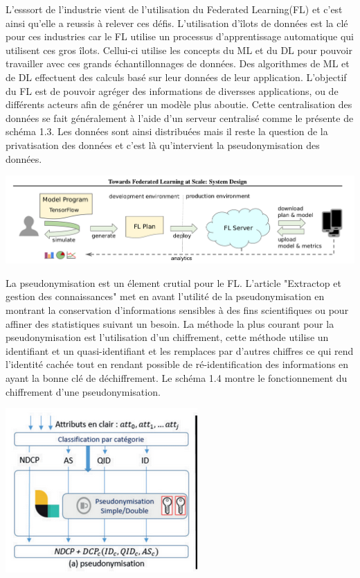 \documentclass[12pt,a4paper]{report}
\begin{document}
L'esssort de l'industrie vient de l'utilisation du Federated Learning(FL) et c'est ainsi qu'elle a reussis à relever ces défis. L'utilisation d'îlots de données est la clé pour ces industries car le FL utilise un processus d'apprentissage automatique qui utilisent ces gros îlots. Cellui-ci utilise les concepts du ML et du DL pour pouvoir travailler avec ces grands échantillonnages de données. Des algorithmes de ML et de DL effectuent des calculs basé sur leur données de leur application. L'objectif du FL est de pouvoir agréger des informations de diversses applications, ou de différents acteurs afin de générer un modèle plus aboutie. Cette centralisation des données se fait généralement à l'aide d'un serveur centralisé comme le présente de schéma 1.3. Les données sont ainsi distribuées mais il reste la question de la privatisation des données et c'est là qu'intervient la pseudonymisation des données.
 

\begin{center}
	\includegraphics[scale=0.3]{mobile_schema_fl}
	\label{fig1}
\end{center}

La pseudonymisation est un élement crutial pour le FL. L'article "Extractop et gestion des connaissances" met en avant l'utilité de la pseudonymisation en montrant la conservation d'informations sensibles à des fins scientifiques ou pour affiner des statistiques suivant un besoin. La méthode la plus courant pour la pseudonymisation est l'utilisation d'un chiffrement, cette méthode utilise un identifiant et un quasi-identifiant et les remplaces par d'autres chiffres ce qui rend l'identité cachée tout en rendant possible de ré-identification des informations en ayant la bonne clé de déchiffrement. Le schéma 1.4 montre le fonctionnement du chiffrement d'une pseudonymisation.\\

\begin{center}
	\includegraphics[scale=0.7]{pseudo}
	\label{fig1}
\end{center}
\end{document}
